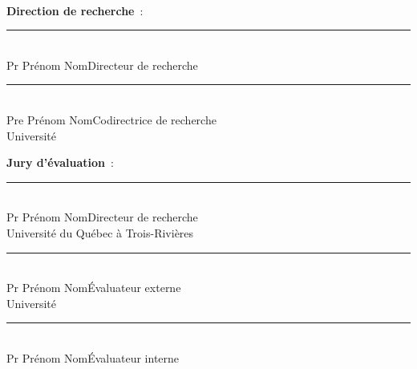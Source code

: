 \newpage
\thispagestyle{empty}
\begin{center}
{\large\MakeUppercase{\University}}\\[3mm]
{\large\MakeUppercase{\Programme}}
\end{center}

\vspace{1cm}

\noindent\textbf{Direction de recherche}~:

\vspace{5mm}
\noindent\rule{\linewidth}{0.4pt}\\[-8pt]
Pr Prénom Nom\hfill Directeur de recherche\\[-8pt]
\University

\vspace{5mm}
\noindent\rule{\linewidth}{0.4pt}\\[-8pt]
Pre Prénom Nom\hfill Codirectrice de recherche\\[-8pt]
Université

\vspace{1.5cm}

\noindent\textbf{Jury d'évaluation}~:

\vspace{5mm}
\noindent\rule{\linewidth}{0.4pt}\\[-8pt]
Pr Prénom Nom\hfill Directeur de recherche\\[-8pt]
Université du Québec à Trois-Rivières

\vspace{5mm}
\noindent\rule{\linewidth}{0.4pt}\\[-8pt]
Pr Prénom Nom\hfill Évaluateur externe\\[-8pt]
Université

\vspace{5mm}
\noindent\rule{\linewidth}{0.4pt}\\[-8pt]
Pr Prénom Nom\hfill Évaluateur interne\\[-8pt]
\University

